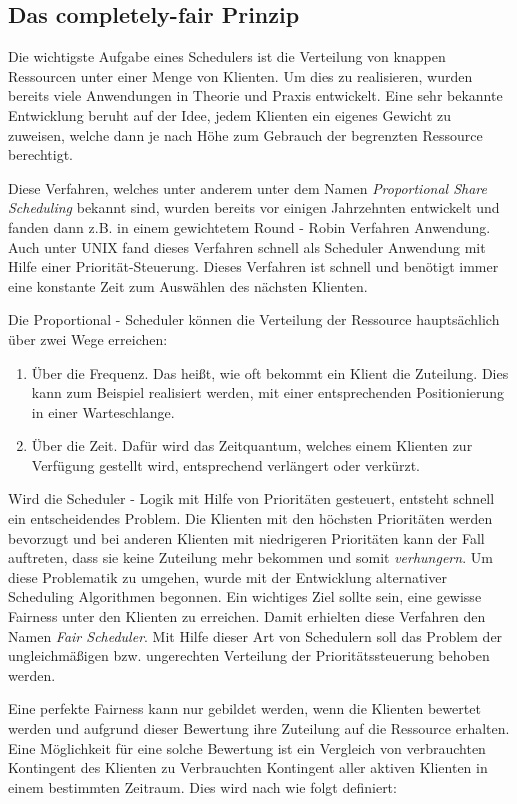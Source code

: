 \subsection{Das completely-fair Prinzip}\label{s:fair}
Die wichtigste Aufgabe eines Schedulers ist die Verteilung von knappen Ressourcen unter einer Menge von Klienten. 
Um dies zu realisieren, wurden bereits viele Anwendungen in Theorie und Praxis entwickelt.
Eine sehr bekannte Entwicklung beruht auf der Idee, jedem Klienten ein eigenes Gewicht zu zuweisen, welche dann je nach Höhe zum Gebrauch der begrenzten Ressource berechtigt.

Diese Verfahren, welches unter anderem unter dem Namen \textit{Proportional Share Scheduling} bekannt sind, wurden bereits vor einigen Jahrzehnten entwickelt und fanden dann z.B. in einem gewichtetem Round - Robin Verfahren Anwendung. Auch unter UNIX fand dieses Verfahren schnell als Scheduler Anwendung mit Hilfe einer Priorität-Steuer\-ung. Dieses Verfahren ist schnell und benötigt immer eine konstante Zeit zum Auswählen des nächsten Klienten. 

Die Proportional - Scheduler können die Verteilung der Ressource hauptsächlich über zwei Wege erreichen:
\begin{enumerate}
	\item Über die Frequenz. Das heißt, wie oft bekommt ein Klient die Zuteilung. Dies kann zum Beispiel realisiert werden, mit einer entsprechenden Positionierung in einer Warteschlange.
	\item Über die Zeit. Dafür wird das Zeitquantum, welches einem Klienten zur Verfügung gestellt wird, entsprechend verlängert oder verkürzt.
\end{enumerate}

Wird die Scheduler - Logik mit Hilfe von Prioritäten gesteuert, entsteht schnell ein entscheidendes Problem. Die Klienten mit den höchsten Prioritäten werden bevorzugt und bei anderen Klienten mit niedrigeren Prioritäten kann der Fall auftreten, dass sie keine Zuteilung mehr bekommen und somit \textit{verhungern}.
Um diese Problematik zu umgehen, wurde mit der Entwicklung alternativer Scheduling Algorithmen begonnen. Ein wichtiges Ziel sollte sein, eine gewisse Fairness unter den Klienten zu erreichen. Damit erhielten diese Verfahren den Namen \textit{Fair Scheduler}. Mit Hilfe dieser Art von Schedulern soll das Problem der ungleichmäßigen bzw. ungerechten Verteilung der Prioritätssteuerung behoben werden.

Eine perfekte Fairness kann nur gebildet werden, wenn die Klienten bewertet werden und aufgrund dieser Bewertung ihre Zuteilung auf die Ressource erhalten.
Eine Möglichkeit für eine solche Bewertung ist ein Vergleich von verbrauchten Kontingent des Klienten zu Verbrauchten Kontingent aller aktiven Klienten in einem bestimmten Zeitraum. 
Dies wird nach \cite{usenix} wie folgt definiert:

